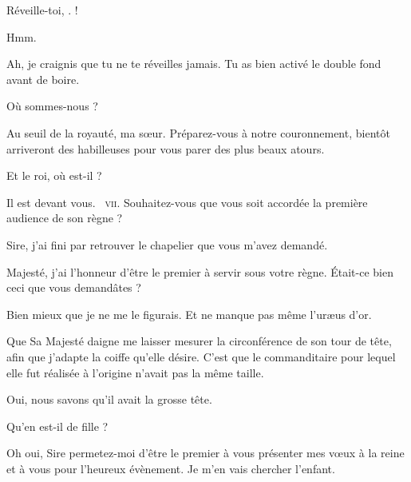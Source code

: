 \begin{drama}
  \elenaspeaks {} Réveille-toi, \ela. \ela !

  \elaspeaks {} Hmm.

  \elenaspeaks Ah, je craignis que tu ne te réveilles jamais. Tu as bien activé le double fond avant de boire.

  \elaspeaks {} Où sommes-nous ?

  \elenaspeaks Au seuil de la royauté, ma sœur. Préparez-vous à notre couronnement, bientôt arriveront des habilleuses pour vous parer des plus beaux atours.

  \elaspeaks Et le roi, où est-il ?

  \elenaspeaks Il est devant vous. \elena~\textsc{vii}. Souhaitez-vous que vous soit accordée la première audience de son règne ?


  \alexasspeaks Sire, j’ai fini par retrouver le chapelier que vous m’avez demandé.

  \chapelierspeaks Majesté, j’ai l’honneur d’être le premier à servir sous votre règne. Était-ce bien ceci que vous demandâtes ?


  \alexasspeaks Bien mieux que je ne me le figurais. Et ne manque pas même l’uræus d’or.

  \chapelierspeaks Que Sa Majesté daigne me laisser mesurer la circonférence de son tour de tête, afin que j’adapte la coiffe qu’elle désire. C’est que le commanditaire pour lequel elle fut réalisée à l’origine n’avait pas la même taille.

  \alexasspeaks Oui, nous savons qu’il avait la grosse tête.


  \exit{\chapelier}


  \elenaspeaks Qu’en est-il de  fille \alexas ? 

  \alexasspeaks Oh oui, Sire permetez-moi d’être le premier à vous présenter mes vœux à la reine et à vous pour l’heureux évènement. Je m’en vais chercher l’enfant.

  \exit{\alexas}


\end{drama}
